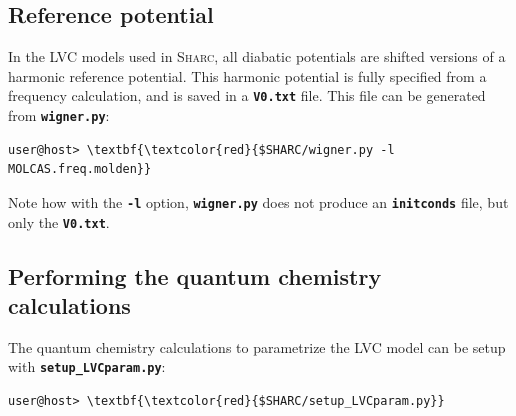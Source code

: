 \documentclass[a4paper,11pt,DIV=15,openany]{scrbook}
\newcommand{\sharc}{\textsc{Sharc}}
\newcommand{\ttt}[1]{\textbf{\texttt{#1}}}
\begin{document}
\subsection{Reference potential}

In the LVC models used in \sharc, all diabatic potentials are shifted versions of a harmonic reference potential.
This harmonic potential is fully specified from a frequency calculation, and is saved in a \ttt{V0.txt} file.
This file can be generated from \ttt{wigner.py}:
\begin{Verbatim}[commandchars=\\\{\}]
user@host> \textbf{\textcolor{red}{$SHARC/wigner.py -l MOLCAS.freq.molden}}
\end{Verbatim}
Note how with the \ttt{-l} option, \ttt{wigner.py} does not produce an \ttt{initconds} file, but only the \ttt{V0.txt}.

\subsection{Performing the quantum chemistry calculations}

The quantum chemistry calculations to parametrize the LVC model can be setup with \ttt{setup\_LVCparam.py}:
\begin{Verbatim}[commandchars=\\\{\}]
user@host> \textbf{\textcolor{red}{$SHARC/setup_LVCparam.py}}
\end{Verbatim}
\end{document}
